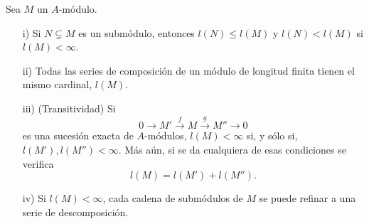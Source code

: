 \documentclass[../main.tex]{subfiles}
\begin{document}
\begin{theorem}
Sea $M$ un $A$-módulo.
\begin{itemize}
    \item[i)] Si $N\subsetneq M$ es un submódulo, entonces $l(N)\leq l(M)$ y $l(N)<l(M)$ si $l(M)<\infty$.
    \item[ii)] Todas las series de composición de un módulo de longitud finita tienen el mismo cardinal, $l(M).$
    \item[iii)] (Transitividad) Si
    $$0\rightarrow M'\overset{f}{\rightarrow} M\overset{g}{\rightarrow}M''\rightarrow 0$$
    es una sucesión exacta de $A$-módulos, $l(M)<\infty$ si, y sólo si, $l(M'),l(M'')<\infty.$ Más aún, si se da cualquiera de esas condiciones se verifica
    $$l(M)=l(M')+l(M'').$$
    \item[iv)] Si $l(M)<\infty$, cada cadena de submódulos de $M$ se puede refinar a una serie de descomposición.
\end{itemize}
\end{theorem}
\end{document}
